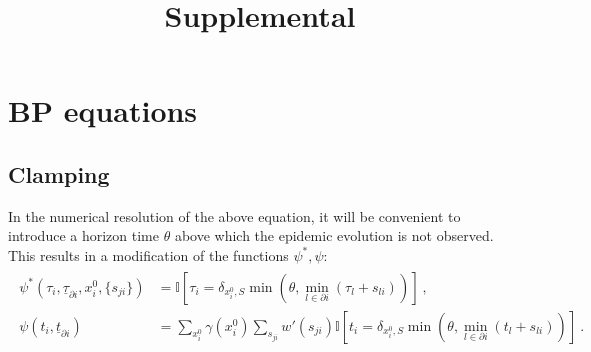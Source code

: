 \documentclass[a4paper, amsfonts, amssymb, amsmath, reprint, showkeys, nofootinbib, twoside, floatfix, pre,superscriptaddress, onecolumn]{revtex4-2}
\begin{document}
\title{Supplemental}

\maketitle

\section{BP equations}
\label{app:BP_derivation}

\subsection{Clamping} In the numerical resolution of the above equation, it will be convenient to introduce a horizon time $\theta$ above which the epidemic evolution is not observed.
This results in a modification of the functions $\psi^*, \psi$:
\begin{align}
\begin{aligned}
	\psi^*(\tau_i,\underline{\tau}_{\partial i},x_i^0,\{s_{ji}\}) &= \mathbb{I}[\tau_i=\delta_{x_i^0,S}\min(\theta,\min_{l\in\partial i}(\tau_l+s_{li}))] \ ,\\
	\psi(t_i,\underline{t}_{\partial i}) &=\sum_{x_i^0}\gamma(x_i^0)\sum_{s_{ji}}w'(s_{ji})\mathbb{I}[t_i=\delta_{x_i^0,S}\min(\theta,\min_{l\in\partial i}(t_l+s_{li}))] \ .
\end{aligned}
\end{align}
\end{document}
